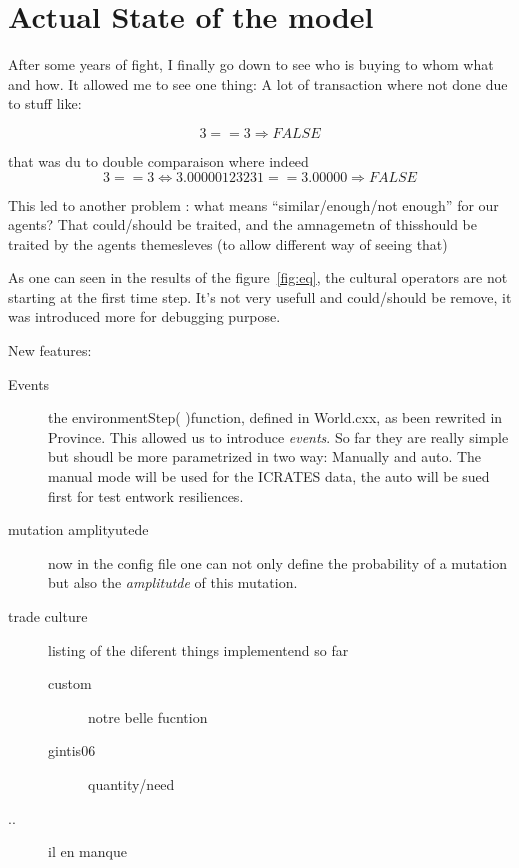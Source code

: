 \documentclass[a4paper]{article}
\begin{document}
	\section{Actual State of the model}
	After some years of fight, I finally go down to see who is buying to whom what and how. It allowed me to see one thing: A lot of transaction where not done due to stuff like:

	$$3==3 \Rightarrow FALSE$$

	that was du to double comparaison where indeed 
	$$3==3 \Leftrightarrow 3.00000123231 == 3.00000 \Rightarrow FALSE$$

	This led to another problem : what means ``similar/enough/not enough'' for our agents? That could/should be traited, and the amnagemetn of thisshould be traited by the agents themesleves (to allow different way of seeing that)

	As one can seen in the results of the figure~\ref{fig:eq}, the cultural operators are not starting at the first time step. It's not very usefull and could/should be remove, it was introduced more for debugging purpose.

	New features: \begin{description}
	    \item[Events] the environmentStep( )function, defined in World.cxx, as been rewrited in Province. This allowed us to introduce \emph{events}. So far they are really simple but shoudl be more parametrized in two way: Manually and auto. The manual mode will be used for the ICRATES data, the auto will be sued first for test entwork resiliences.
	    \item[mutation amplityutede] now in the config file one can not only define the probability of a mutation but also the \emph{amplitutde} of this mutation. 
	    \item[trade culture]  listing of the diferent things implementend so far
		\begin{description}
		    \item[custom] notre belle fucntion
		    \item[gintis06] quantity/need
		\end{description}
	    \item[..] il en manque
	\end{description}
	
\end{document}
